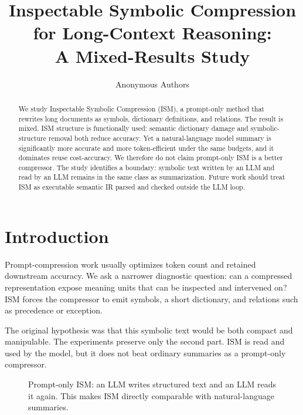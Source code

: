 \documentclass[10pt,twocolumn]{article}
\title{\vspace{-1.2em}Inspectable Symbolic Compression for Long-Context Reasoning:\\A Mixed-Results Study}
\author{Anonymous Authors}
\date{}
\newcommand{\ism}{\textsc{ISM}}
\begin{document}
\maketitle
\vspace{-1.7em}

\begin{abstract}
We study Inspectable Symbolic Compression (\ism), a prompt-only method that
rewrites long documents as symbols, dictionary definitions, and relations.  The
result is mixed.  \ism{} structure is functionally used: semantic dictionary
damage and symbolic-structure removal both reduce accuracy.  Yet a
natural-language model summary is significantly more accurate and more
token-efficient under the same budgets, and it dominates reuse cost-accuracy.
We therefore do not claim prompt-only \ism{} is a better compressor.  The study
identifies a boundary: symbolic text written by an LLM and read by an LLM
remains in the same class as summarization.  Future work should treat \ism{} as
executable semantic IR parsed and checked outside the LLM loop.
\end{abstract}

\section{Introduction}

Prompt-compression work usually optimizes token count and retained downstream
accuracy.  We ask a narrower diagnostic question: can a compressed
representation expose meaning units that can be inspected and intervened on?
\ism{} forces the compressor to emit symbols, a short dictionary, and relations
such as precedence or exception.

The original hypothesis was that this symbolic text would be both compact and
manipulable.  The experiments preserve only the second part.  \ism{} is read
and used by the model, but it does not beat ordinary summaries as a prompt-only
compressor.

\begin{figure}[t]
\centering
\scriptsize
{}
\caption{Prompt-only \ism{}: an LLM writes structured text and an LLM reads it
again.  This makes \ism{} directly comparable with natural-language summaries.}
\label{fig:pipeline}
\end{figure}
\end{document}
